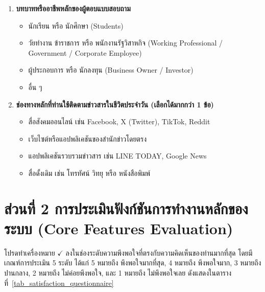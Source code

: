 \begin{enumerate}
    \item \textbf{บทบาทหรืออาชีพหลักของผู้ตอบแบบสอบถาม}
    \begin{itemize}[noitemsep]
        \item[$\square$] นักเรียน หรือ นักศึกษา (Students)
        \item[$\square$] วัยทำงาน ข้าราชการ หรือ พนักงานรัฐวิสาหกิจ (Working Professional / Government / Corporate Employee)
        \item[$\square$] ผู้ประกอบการ หรือ นักลงทุน (Business Owner / Investor)
        \item[$\square$] อื่น ๆ
    \end{itemize}
    \item \textbf{ช่องทางหลักที่ท่านใช้ติดตามข่าวสารในชีวิตประจำวัน (เลือกได้มากกว่า 1 ข้อ)}
    \begin{itemize}[noitemsep]
        \item[$\square$] สื่อสังคมออนไลน์ เช่น Facebook, X (Twitter), TikTok, Reddit
        \item[$\square$] เว็บไซต์หรือแอปพลิเคชันของสำนักข่าวโดยตรง
        \item[$\square$] แอปพลิเคชันรวบรวมข่าวสาร เช่น LINE TODAY, Google News
        \item[$\square$] สื่อดั้งเดิม เช่น โทรทัศน์ วิทยุ หรือ หนังสือพิมพ์
    \end{itemize}
\end{enumerate}

\section*{ส่วนที่ 2 การประเมินฟังก์ชันการทำงานหลักของระบบ (Core Features Evaluation)}

โปรดทำเครื่องหมาย $\checkmark$ ลงในช่องระดับความพึงพอใจที่ตรงกับความคิดเห็นของท่านมากที่สุด โดยมีเกณฑ์การประเมิน 5 ระดับ ได้แก่ 5 หมายถึง พึงพอใจมากที่สุด, 4 หมายถึง พึงพอใจมาก, 3 หมายถึง ปานกลาง, 2 หมายถึง ไม่ค่อยพึงพอใจ, และ 1 หมายถึง ไม่พึงพอใจเลย ดังแสดงในตารางที่~\ref{tab_satisfaction_questionnaire}

